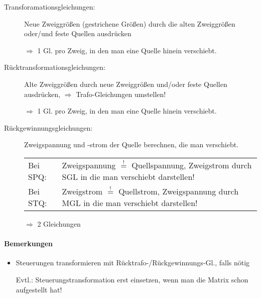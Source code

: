 \begin{description}
  \item[Transforamationsgleichungen:]
    Neue Zweiggrößen (gestrichene Größen) durch die alten Zweiggrößen
    oder/und feste Quellen ausdrücken
    
    $\Rightarrow$ 1 Gl. pro Zweig, in den man eine Quelle hinein verschiebt.
  
  \item[Rücktransformationsgleichungen:]
    Alte Zweiggrößen durch neue Zweiggrößen und/oder feste Quellen ausdrücken,
    $\Rightarrow$ Trafo-Gleichungen umstellen!
    
    $\Rightarrow$ 1 Gl. pro Zweig, in den man eine Quelle hinein verschiebt.
    
  \item[Rückgewinnungsgleichungen:]
    Zweigspannung und -strom der Quelle berechnen, die man verschiebt.
    
    \begin{tabularx}{\textwidth}{lX}
      Bei SPQ: & Zweigspannung $\stackrel{!}{=}$ Quellspannung,\newline
        Zweigstrom durch SGL in die man verschiebt darstellen!\\
      Bei STQ: & Zweigstrom $\stackrel{!}{=}$ Quellstrom,\newline
        Zweigspannung durch MGL in die man verschiebt darstellen! 
    \end{tabularx}
    $\Rightarrow$ 2 Gleichungen
    
\end{description}
\paragraph{Bemerkungen}
\begin{itemize}
  \item
Steuerungen transformieren mit Rücktrafo-/Rückgewinnungs-Gl., falls nötig

Evtl.: Steuerungstransformation erst einsetzen, wenn man die Matrix schon
aufgestellt hat!


\end{itemize}


